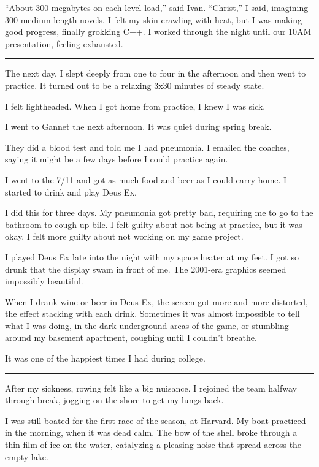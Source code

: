 ``About 300 megabytes on each level load,'' said Ivan.  ``Christ,'' I said,
imagining 300 medium-length novels.  I felt my skin crawling with heat, but I
was making good progress, finally grokking C++.  I worked through the night
until our 10AM presentation, feeling exhausted.

\plainfancybreak{12pt}{2}{* * *}

The next day, I slept deeply from one to four in the afternoon and then went to
practice.  It turned out to be a relaxing 3x30 minutes of steady state.  

I felt lightheaded.  When I got home from practice, I knew I was sick.  

I went to Gannet the next afternoon.  It was quiet during spring break.

They did a blood test and told me I had pneumonia.  I emailed the coaches,
saying it might be a few days before I could practice again.

I went to the 7/11 and got as much food and beer as I could carry home.  I
started to drink and play Deus Ex.  

I did this for three days.  My pneumonia got pretty bad, requiring me to go to
the bathroom to cough up bile.  I felt guilty about not being at practice, but
it was okay.  I felt more guilty about not working on my game project. 
 
I played Deus Ex late into the night with my space heater at my feet.  I got so
drunk that the display swam in front of me.  The 2001-era graphics seemed
impossibly beautiful.  

When I drank wine or beer in Deus Ex, the screen got more and more distorted,
the effect stacking with each drink.  Sometimes it was almost impossible to tell
what I was doing, in the dark underground areas of the game, or stumbling around
my basement apartment, coughing until I couldn't breathe.

It was one of the happiest times I had during college.

\plainfancybreak{12pt}{2}{* * *}

After my sickness, rowing felt like a big nuisance.  I rejoined the team halfway
through break, jogging on the shore to get my lungs back.  

I was still boated for the first race of the season, at Harvard.  My boat
practiced in the morning, when it was dead calm.  The bow of the shell broke
through a thin film of ice on the water, catalyzing a pleasing noise that spread
across the empty lake.   
 
